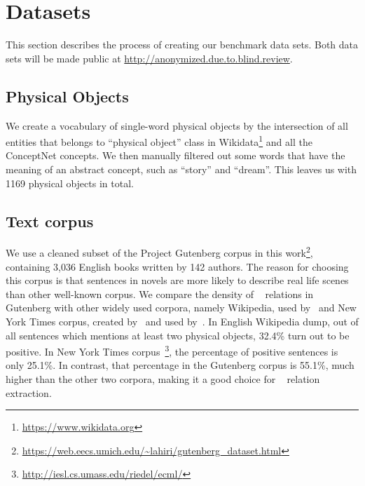 \section{Datasets}
\label{sec:data}

This section describes the process of creating our benchmark data sets.
Both data sets will be made public at 
\url{http://anonymized.due.to.blind.review}.

\subsection{Physical Objects}
We create a vocabulary of single-word physical objects by the 
intersection of all entities that belongs to ``physical object'' class
in Wikidata\footnote{\url{https://www.wikidata.org}} and 
all the ConceptNet concepts. We then manually filtered out some 
words that have the meaning of an abstract concept, 
such as ``story'' and ``dream''. This leaves us with
1169 physical objects in total.

\subsection{Text corpus}
We use a cleaned subset of the Project Gutenberg corpus \cite{lahiri:2014:SRW} 
in this work\footnote{\url{https://web.eecs.umich.edu/~lahiri/gutenberg_dataset.html}}, containing 3,036 English books written by 142 authors.
The reason for choosing this corpus is that sentences in novels are 
more likely to describe real life scenes than other well-known corpus. 
We compare the density of \lnear~ relations in Gutenberg with other 
widely used corpora, namely Wikipedia, 
used by~\citeauthor{mintz2009distant} and New York Times corpus, 
created by~\citeauthor{riedel2010modeling} and 
used by~\citeauthor{Lin2016NeuralRE,hoffmann2011knowledge,surdeanu2012multi}. 
In English Wikipedia dump, out of all sentences which mentions at least two
physical objects, 32.4\% turn out to be positive. 
In New York Times corpus~\footnote{\url{http://iesl.cs.umass.edu/riedel/ecml/}},
the percentage of positive sentences is only 25.1\%. 
In contrast, that percentage in the Gutenberg corpus is 55.1\%, much higher 
than the other two corpora, making it a good choice for \lnear~ 
relation extraction.

